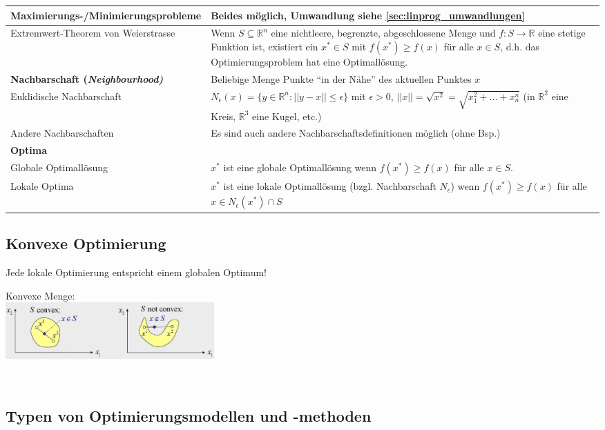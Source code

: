 \begin{tabularx}{\textwidth}{p{7cm} X}
  \hline
    \textbf{Maximierungs-/Minimierungsprobleme} & Beides möglich, Umwandlung siehe \ref{sec:linprog_umwandlungen}\\
  \hline
    Extremwert-Theorem von Weierstrasse
      & Wenn $S \subseteq \mathbb{R}^n$ eine nichtleere, begrenzte, abgeschlossene Menge und $f: S \rightarrow \mathbb{R}$ eine stetige Funktion ist, existiert ein $x^* \in S$ mit $f(x^*) \geq f(x)$
       für alle $x \in S$, d.h. das Optimierungsproblem hat eine Optimallösung.\\
  \hline
    \textbf{Nachbarschaft (\em Neighbourhood\em)} & Beliebige Menge Punkte "`in der Nähe"' des aktuellen Punktes $x$\\
  \hline
    Euklidische Nachbarschaft
      & $N_\epsilon(x) = \{ y \in \mathbb{R}^n: ||y-x|| \leq \epsilon \}$ mit $\epsilon > 0$, $||x|| = \sqrt{x^2} = \sqrt{x_1^2 + ... + x_n^n}$ (in $\mathbb{R}^2$ eine Kreis, $\mathbb{R}^3$ eine Kugel, etc.)\\
    Andere Nachbarschaften
      & Es sind auch andere Nachbarschaftsdefinitionen möglich (ohne Bsp.)\\
  \hline
    \textbf{Optima} &\\
  \hline
      Globale Optimallösung
      & $x^*$ ist eine globale Optimallösung wenn $f(x^*) \geq f(x)$ für alle $x \in S$.\\
    Lokale Optima
      & $x^*$ ist eine lokale Optimallösung (bzgl. Nachbarschaft $N_\epsilon$) wenn $f(x^*) \geq f(x)$ für alle $x \in N_\epsilon(x^*) \cap S$\\    
  \end{tabularx}
  

\subsection{Konvexe Optimierung }
  Jede lokale Optimierung entspricht einem globalen Optimum!
  
  Konvexe Menge:\\
  \includegraphics[width=8cm]{./Content/OptMathModels/ConvexSet}
  
  \\
\subsection{Typen von Optimierungsmodellen und -methoden }

